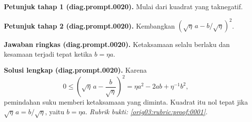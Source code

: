 \par\noindent\textbf{Petunjuk tahap 1 (diag.prompt.0020).}
Mulai dari kuadrat yang taknegatif.
\label{orig03:diag:hint1:0020}
\par\noindent\textbf{Petunjuk tahap 2 (diag.prompt.0020).}
Kembangkan $(\sqrt\eta\,a-b/\sqrt\eta)^2$.
\label{orig03:diag:hint2:0020}
\par\noindent\textbf{Jawaban ringkas (diag.prompt.0020).}
Ketaksamaan selalu berlaku dan kesamaan terjadi tepat ketika $b=\eta a$.
\label{orig03:diag:answer:0020}
\par\noindent\textbf{Solusi lengkap (diag.prompt.0020).}
Karena
\[
0\leq\left(\sqrt\eta\,a-\frac{b}{\sqrt\eta}\right)^2
=\eta a^2-2ab+\eta^{-1}b^2,
\]
pemindahan suku memberi ketaksamaan yang diminta. Kuadrat itu nol tepat jika
$\sqrt\eta\,a=b/\sqrt\eta$, yaitu $b=\eta a$.
\emph{Rubrik bukti: \ref{orig03:rubric:proof:0001}.}
\label{orig03:diag:solution:0020}
